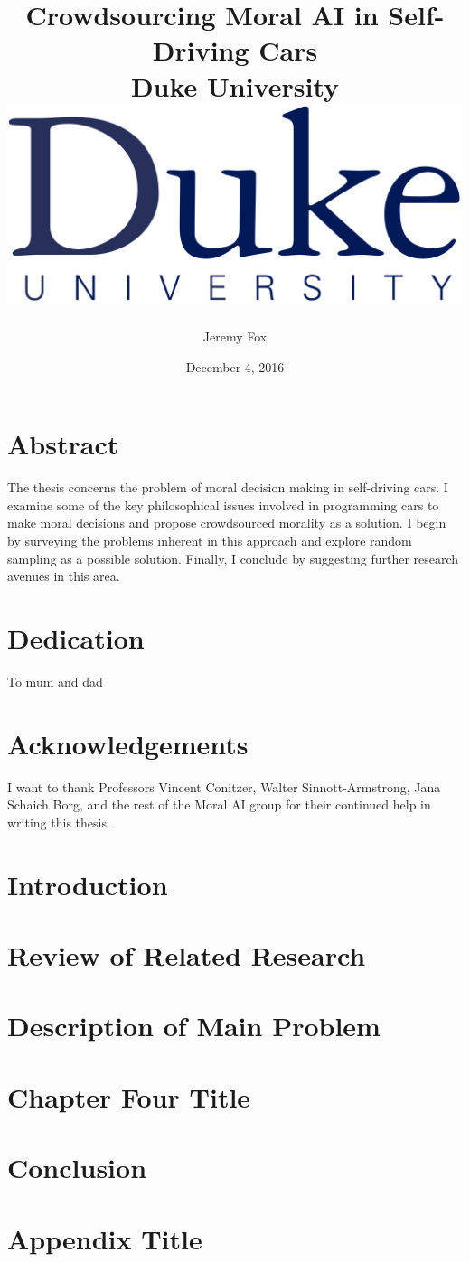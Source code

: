 \documentclass[12pt]{report}
\title{
	{Crowdsourcing Moral AI in Self-Driving Cars}\\
	{\large Duke University}\\
	{\includegraphics[width=\textwidth]{duke.png}}
}
\author{Jeremy Fox}
\date{December 4, 2016}
\begin{document}
\maketitle




\chapter*{Abstract}
The thesis concerns the problem of moral decision making in self-driving cars. I examine some of the key philosophical issues involved in programming cars to make moral decisions and propose crowdsourced morality as a solution. I begin by surveying the problems inherent in this approach and explore random sampling as a possible solution. Finally, I conclude by suggesting further research avenues in this area.

\chapter*{Dedication}
To mum and dad

\chapter*{Acknowledgements}
I want to thank Professors Vincent Conitzer, Walter Sinnott-Armstrong, Jana Schaich Borg, and the rest of the Moral AI group for their continued help in writing this thesis.

\tableofcontents

\chapter{Introduction}


\chapter{Review of Related Research}


\chapter{Description of Main Problem}


\chapter{Chapter Four Title}


\chapter{Conclusion}


\appendix
\chapter{Appendix Title}




{}

\end{document}
